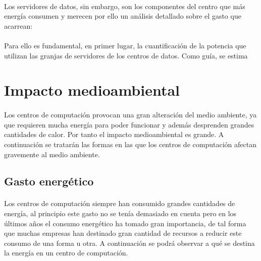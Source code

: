 \documentclass[10pt]{article}
\begin{document}
            \paragraph{}
            Los servidores de datos, sin embargo, son los componentes del centro que más energía consumen y merecen por ello un análisis detallado sobre el gasto que acarrean: \cite{datacenters:consumo}
            
            \paragraph{}
            Para ello es fundamental, en primer lugar, la cuantificación de la potencia que utilizan las granjas de servidores de los centros de datos. Como guía, se estima

  \section{Impacto medioambiental}
	\label{sec:impacto}

    \paragraph{}
		Los centros de computación provocan una gran alteración del medio ambiente, ya que requieren mucha energía para poder funcionar y además desprenden grandes cantidades de calor. Por tanto el impacto medioambiental es grande. A continuación se tratarán las formas en las que los centros de computación afectan gravemente al medio ambiente.

    \subsection{Gasto energético}
	  	\paragraph{}
		Los centros de computación siempre han consumido grandes cantidades de energía, al principio este gasto no se tenía demasiado en cuenta pero en los últimos años el consumo energético ha tomado gran importancia, de tal forma que muchas empresas han destinado gran cantidad de recursos a reducir este consumo de una forma u otra. A continuación se podrá observar a qué se destina la energía en un centro de computación. 
        
\end{document}

